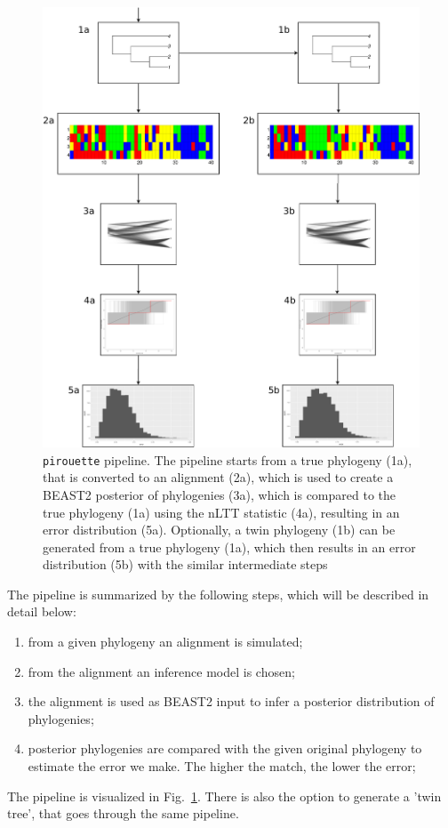 \documentclass{article}
\begin{document}
\begin{figure}
  \centering
  \includegraphics[width=\textwidth]{workflow.png}
  \caption{
    \texttt{pirouette} pipeline. 
    The pipeline starts from a true phylogeny (1a), 
    that is converted to an alignment (2a), which is used
    to create a BEAST2 posterior of phylogenies (3a),
    which is compared to the true phylogeny (1a) using
    the nLTT statistic (4a), resulting in an error distribution (5a).
    Optionally, a twin phylogeny (1b) can be generated from a true
    phylogeny (1a), which then results in an error distribution (5b) with
    the similar intermediate steps 
  }
  \label{fig:pipeline}
\end{figure}

The pipeline is summarized by the following steps, which will be described in detail below:
\begin{enumerate}
    \item from a given phylogeny an alignment is simulated;
    \item from the alignment an inference model is chosen;
    \item the alignment is used as BEAST2 input to infer a posterior distribution of phylogenies;
    \item posterior phylogenies are compared with the given original phylogeny to estimate the error we make. The higher the match, the lower the error;
\end{enumerate}
The pipeline is visualized in Fig.~\ref{fig:pipeline}.
There is also the option to generate a 'twin tree',
that goes through the same pipeline.
\end{document}
